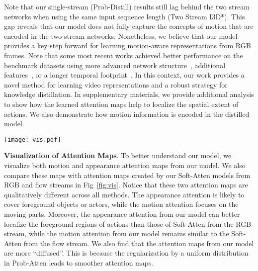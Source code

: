 \documentclass{bmvc2k}
\begin{document}
Note that our single-stream (Prob-Distill) results still lag behind the two stream networks when using the same input sequence length (Two Stream I3D*). This gap reveals that our model does not fully capture the concepts of motion that are encoded in the two stream networks. Nonetheless, we believe that our model provides a key step forward for learning motion-aware representations from RGB frames. Note that some most recent works achieved better performance on the benchmark datasets using more advanced network  structure~\cite{hara2018can,Wang_2018_CVPR,Xie_2018_ECCV,Piergiovanni_2019_CVPR}, additional features~\cite{choutas2018potion}, or a longer temporal footprint~\cite{carreira2017quo,crasto2019mars}. In this context, our work provides a novel method for learning video representations and a robust strategy for knowledge distillation. In supplementary materials, we provide additional analysis to show how the learned attention maps help to localize the spatial extent of actions. We also demonstrate how motion information is encoded in the distilled model.

\begin{figure*}[t]
\centering
\texttt{[image: vis.pdf]}\vspace{-0.6em}
\caption{Visualization of attention maps (Ours vs.\ Soft-Atten using the same I3D backbone). For each video clip, we re-interpolate the attention maps and plot them on the first and last frame. Red regions indicate higher value of attention. Our model produces appearance and motion attention maps that are qualitatively different and index key action regions.}\vspace{-1.5em}
\label{fig:vis}
\end{figure*}

\noindent \textbf{Visualization of Attention Maps}. To better understand our model, we visualize both motion and appearance attention maps from our model. We also compare these maps with attention maps created by our Soft-Atten models from RGB and flow streams in Fig~\ref{fig:vis}. Notice that these two attention maps are qualitatively different across all methods. The appearance attention is likely to cover foreground objects or actors, while the motion attention focuses on the moving parts. Moreover, the appearance attention from our model can better localize the foreground regions of actions than those of Soft-Atten from the RGB stream, while the motion attention from our model remains similar to the Soft-Atten from the flow stream. We also find that the attention maps from our model are more ``diffused''. This is because the regularization by a uniform distribution in Prob-Atten leads to smoother attention maps.
\end{document}
